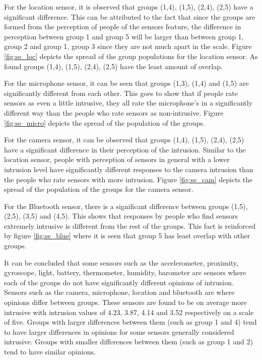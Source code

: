 For the location sensor, it is observed that groups (1,4), (1,5), (2,4), (2,5) have a significant difference. This can be attributed to the fact that since the groups are formed from the perception of people of the sensors feature, the difference in perception between group 1 and group 5 will be larger than between group 1, group 2 and group 1, group 3 since they are not much apart in the scale. Figure \ref{fig:se_loc} depicts the spread of the group populations for the location sensor. As found groups (1,4), (1,5), (2,4), (2,5) have the least amount of overlap.

For the microphone sensor, it can be seen that groups (1,3), (1,4) and (1,5) are significantly different from each other. This goes to show that
if people rate sensors as even a little intrusive, they all rate the microphone's in a significantly different way than the people who rate sensors as non-intrusive. Figure \ref{fig:se_micro} depicts the spread of the population of the groups.

For the camera sensor, it can be observed that groups (1,4), (1,5), (2,4), (2,5) have a significant difference in their perception of the intrusion. Similar to the location sensor, people with perception of sensors in general with a lower intrusion level have significantly different responses to the camera intrusion than the people who rate sensors with more intrusion. Figure \ref{fig:se_cam} depicts the spread of the population of the groups for the camera sensor.

For the Bluetooth sensor, there is a significant difference between groups (1,5), (2,5), (3,5) and (4,5). This shows that responses by people who find sensors extremely intrusive is different from the rest of the groups. This fact is reinforced by figure \ref{fig:se_blue} where it is seen that group 5 has least overlap with other groups.

It can be concluded that some sensors such as the accelerometer, proximity, gyroscope, light, battery, thermometer, humidity, barometer are sensors where each of the groups do not have significantly different opinions of intrusion. Sensors such as the camera, microphone, location and bluetooth
are where opinions differ between groups. These sensors are found to be on average more intrusive with intrusion values of 4.23, 3.87, 4.14 and 3.52 respectively on a scale of five. Groups with larger differences between them (such as group 1 and 4) tend to have larger differences in opinions for some sensors generally considered intrusive. Groups with smaller differences between them (such as group 1 and 2) tend to have similar opinions.

